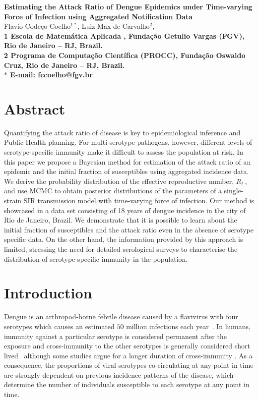\documentclass[10pt]{article}
\date{}
\def \rr {$R_{t}\:$}
\begin{document}
\begin{flushleft}
{\Large
\textbf{Estimating the Attack Ratio of Dengue Epidemics under Time-varying 
Force of Infection using Aggregated Notification Data}
}
\\
Flavio Code\c{c}o Coelho$^{1\ast}$, 
Luiz Max de Carvalho$^{2}$, 
\\
\bf{1} Escola de Matem\'atica Aplicada , Funda\c{c}\~ao Getulio Vargas (FGV), 
Rio de Janeiro -- RJ, Brazil.
\\
\bf{2} Programa de Computa\c{c}\~ao Cient\'ifica (PROCC), Funda\c{c}\~ao Oswaldo 
Cruz, Rio de Janeiro -- RJ, Brazil.
\\
$\ast$ E-mail: fccoelho@fgv.br
\end{flushleft}

\section*{Abstract}

Quantifying the attack ratio of disease is key to epidemiological inference and 
Public Health planning.
For multi-serotype pathogens, however, different levels of 
serotype-specific immunity make it difficult to assess the population at risk. 
In this paper we propose a Bayesian method for estimation of the attack ratio 
of an epidemic and the initial fraction of susceptibles using aggregated 
incidence data. 
We derive the probability distribution of the effective reproductive number, 
\rr, and use MCMC to obtain posterior 
distributions of the parameters of a single-strain SIR transmission model with 
time-varying force of infection.
Our method is showcased in a data set consisting of 18 years of dengue 
incidence in the city of Rio de Janeiro, Brazil.
We demonstrate that it is possible to learn about the initial fraction of 
susceptibles and the attack ratio even in the absence of serotype specific data.
On the other hand, the information provided by this approach is limited, 
stressing the need for detailed serological surveys to characterise the 
distribution of serotype-specific immunity in the population.

\section*{Introduction}

Dengue is an arthropod-borne febrile disease caused by a flavivirus with four 
serotypes which causes an estimated  $50$ million infections each 
year~\cite{Guzman2010}.
In humans, immunity against  a particular serotype is  considered permanent 
after the exposure and cross-immunity to the other serotypes is 
generally considered short lived~\cite{halstead_dengue_2007} although some 
studies argue for a longer duration of cross-immunity \cite{Reich2013, 
salje2012}.
As a consequence, the proportions of viral serotypes co-circulating at any 
point in time are strongly dependent on previous incidence patterns of the 
disease, which determine the number of individuals susceptible to each serotype 
at any point in time.
\end{document}

